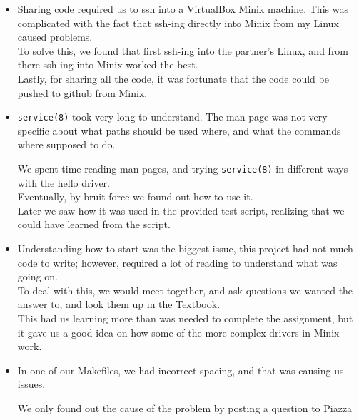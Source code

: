\documentclass[11pt]{article}
\begin{document}
   \begin{itemize}

      \item Sharing code required us to ssh into a VirtualBox Minix machine.
      This was complicated with the fact that ssh-ing directly into Minix from
      my Linux caused problems. \\

      To solve this, we found that first ssh-ing into the partner's Linux, and
      from there ssh-ing into Minix worked the best.\\

      Lastly, for sharing all the code, it was fortunate that the code could be
      pushed to github from Minix. \\

      \item {\tt service(8)} took very long to understand. The man page was not very specific about what paths should be used where, and what the commands where supposed to do.

      We spent time reading man pages, and trying {\tt service(8)} in different ways with the hello driver. \\

      Eventually, by bruit force we found out how to use it. \\

      Later we saw how it was used in the provided test script, realizing that we could have learned from the script.\\

      \item Understanding how to start was the biggest issue, this project had
      not much code to write; however, required a lot of reading to understand
      what was going on.\\

      To deal with this, we would meet together, and ask questions we wanted
      the answer to, and look them up in the Textbook.\\

      This had us learning more than was needed to complete the assignment, but
      it gave us a good idea on how some of the more complex drivers in Minix
      work.\\


      \item In one of our Makefiles, we had incorrect spacing, and that was
      causing us issues. 

      We only found out the cause of the problem by posting a question to
      Piazza\\


\end{itemize}
\end{document}
